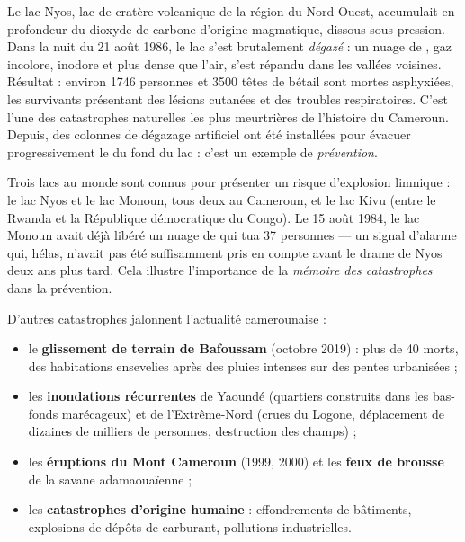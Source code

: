 \documentclass[11pt]{article}
\newcommand{\cle}[1]{{\popxbold\color{popdark}#1}}
\begin{document}
\begin{exemplebox}
Le lac Nyos, lac de cratère volcanique de la région du Nord-Ouest, accumulait en profondeur du dioxyde de carbone  d'origine magmatique, dissous sous pression. Dans la nuit du 21 août 1986, le lac s'est brutalement \emph{dégazé} : un nuage de , gaz incolore, inodore et plus dense que l'air, s'est répandu dans les vallées voisines. Résultat : environ \num{1746} personnes et \num{3500} têtes de bétail sont mortes asphyxiées, les survivants présentant des lésions cutanées et des troubles respiratoires. C'est l'une des catastrophes naturelles les plus meurtrières de l'histoire du Cameroun. Depuis, des colonnes de dégazage artificiel ont été installées pour évacuer progressivement le  du fond du lac : c'est un exemple de \emph{prévention}.
\end{exemplebox}

\begin{savaistu}
Trois lacs au monde sont connus pour présenter un risque d'\cle{explosion limnique} : le lac Nyos et le lac Monoun, tous deux au Cameroun, et le lac Kivu (entre le Rwanda et la République démocratique du Congo). Le 15 août 1984, le lac Monoun avait déjà libéré un nuage de  qui tua 37 personnes — un signal d'alarme qui, hélas, n'avait pas été suffisamment pris en compte avant le drame de Nyos deux ans plus tard. Cela illustre l'importance de la \emph{mémoire des catastrophes} dans la prévention.
\end{savaistu}

D'autres catastrophes jalonnent l'actualité camerounaise :
\begin{itemize}
\item le \textbf{glissement de terrain de Bafoussam} (octobre 2019) : plus de 40 morts, des habitations ensevelies après des pluies intenses sur des pentes urbanisées ;
\item les \textbf{inondations récurrentes} de Yaoundé (quartiers construits dans les bas-fonds marécageux) et de l'Extrême-Nord (crues du Logone, déplacement de dizaines de milliers de personnes, destruction des champs) ;
\item les \textbf{éruptions du Mont Cameroun} (1999, 2000) et les \textbf{feux de brousse} de la savane adamaouaïenne ;
\item les \textbf{catastrophes d'origine humaine} : effondrements de bâtiments, explosions de dépôts de carburant, pollutions industrielles.
\end{itemize}
\end{document}
